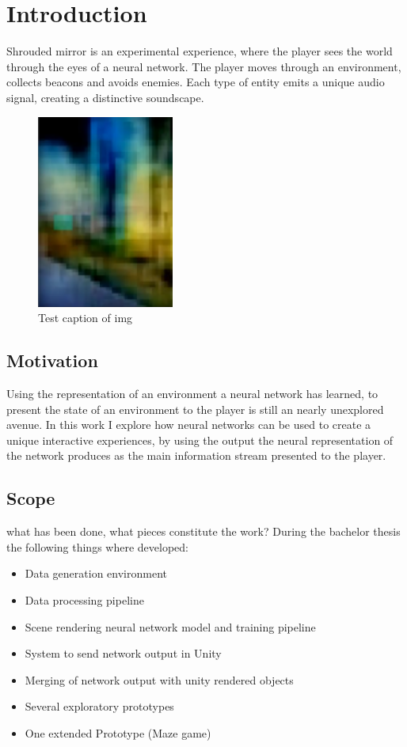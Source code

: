 
\chapter{Introduction}
Shrouded mirror is an experimental experience, where the player sees the world through the eyes of a neural network. The player moves through an environment, collects beacons and avoids enemies. Each type of entity emits a unique audio signal, creating a distinctive soundscape.
\begin{figure}[hbt]
\centering
    \includegraphics[width=0.4\textwidth]{images/FrontCover.png}
    \caption{Test caption of img}
\end{figure}

\section{Motivation}
Using the representation of an environment a neural network has learned, to present the state of an environment to the player is still an nearly unexplored avenue.
In this work I explore how neural networks can be used to create a unique interactive experiences, by using the output the neural representation of the network produces as the main information stream presented to the player.

\section{Scope}
what has been done, what pieces constitute the work?
During the bachelor thesis the following things where developed:

\begin{itemize}
\item{Data generation environment}
\item{Data processing pipeline}
\item{Scene rendering neural network model and training pipeline}
\item{System to send network output in Unity}
\item{Merging of network output with unity rendered objects}
\item{Several exploratory prototypes}
\item{One extended Prototype (Maze game)}
\end{itemize}
